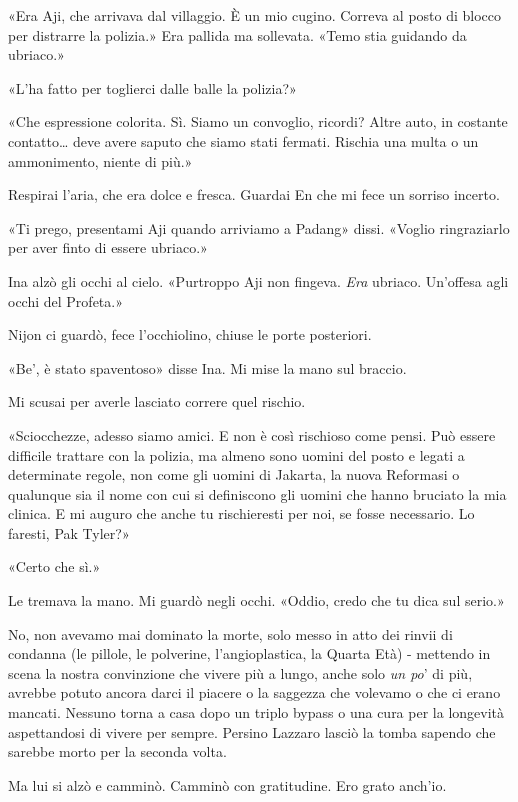 «Era Aji, che arrivava dal villaggio. È un mio cugino. Correva al posto
di blocco per distrarre la polizia.» Era pallida ma sollevata. «Temo
stia guidando da ubriaco.»

«L'ha fatto per toglierci dalle balle la polizia?»

«Che espressione colorita. Sì. Siamo un convoglio, ricordi? Altre auto,
in costante contatto\ldots{} deve avere saputo che siamo stati fermati.
Rischia una multa o un ammonimento, niente di più.»

Respirai l'aria, che era dolce e fresca. Guardai En che mi fece un
sorriso incerto.

«Ti prego, presentami Aji quando arriviamo a Padang» dissi. «Voglio
ringraziarlo per aver finto di essere ubriaco.»

Ina alzò gli occhi al cielo. «Purtroppo Aji non fingeva. \emph{Era}
ubriaco. Un'offesa agli occhi del Profeta.»

Nijon ci guardò, fece l'occhiolino, chiuse le porte posteriori.

«Be', è stato spaventoso» disse Ina. Mi mise la mano sul braccio.

Mi scusai per averle lasciato correre quel rischio.

«Sciocchezze, adesso siamo amici. E non è così rischioso come pensi. Può
essere difficile trattare con la polizia, ma almeno sono uomini del
posto e legati a determinate regole, non come gli uomini di Jakarta, la
nuova Reformasi o qualunque sia il nome con cui si definiscono gli
uomini che hanno bruciato la mia clinica. E mi auguro che anche tu
rischieresti per noi, se fosse necessario. Lo faresti, Pak Tyler?»

«Certo che sì.»

Le tremava la mano. Mi guardò negli occhi. «Oddio, credo che tu dica sul
serio.»

No, non avevamo mai dominato la morte, solo messo in atto dei rinvii di
condanna (le pillole, le polverine, l'angioplastica, la Quarta Età) -
mettendo in scena la nostra convinzione che vivere più a lungo, anche
solo \emph{un po}' di più, avrebbe potuto ancora darci il piacere o la
saggezza che volevamo o che ci erano mancati. Nessuno torna a casa dopo
un triplo bypass o una cura per la longevità aspettandosi di vivere per
sempre. Persino Lazzaro lasciò la tomba sapendo che sarebbe morto per la
seconda volta.

Ma lui si alzò e camminò. Camminò con gratitudine. Ero grato anch'io.